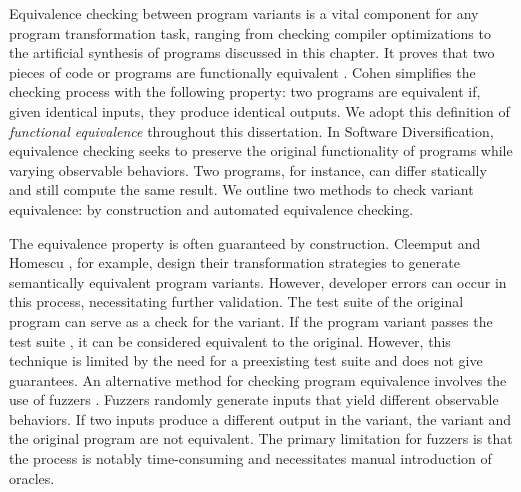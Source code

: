 \label{equivalence:checking}


Equivalence checking between program variants is a vital component for any program transformation task, ranging from checking compiler optimizations \cite{LeCompilers} to the artificial synthesis of programs discussed in this chapter. 
It proves that two pieces of code or programs are functionally equivalent \cite{churchill2019}. 
Cohen \cite{cohen1993operating} simplifies the checking process with the following property: two programs are equivalent if, given identical inputs, they produce identical outputs. 
We adopt this definition of \emph{functional equivalence} throughout this dissertation. 
In Software Diversification, equivalence checking seeks to preserve the original functionality of programs while varying observable behaviors. 
Two programs, for instance, can differ statically and still compute the same result. 
We outline two methods to check variant equivalence: by construction and automated equivalence checking.


\begin{checking}
    \label{check_by_construction}
    The equivalence property is often guaranteed by construction. 
    Cleemput \etal \cite{Cleemput2012} and Homescu \etal \cite{homescu2013profile}, for example, design their transformation strategies to generate semantically equivalent program variants. 
    However, developer errors can occur in this process, necessitating further validation. 
    The test suite of the original program can serve as a check for the variant. 
    If the program variant passes the test suite \cite{harrand2020java}, it can be considered equivalent to the original. 
    However, this technique is limited by the need for a preexisting test suite and does not give guarantees. 
    An alternative method for checking program equivalence involves the use of fuzzers \cite{zalewski2017american}.
    Fuzzers randomly generate inputs that yield different observable behaviors. 
    If two inputs produce a different output in the variant, the variant and the original program are not equivalent. 
    The primary limitation for fuzzers is that the process is notably time-consuming and necessitates manual introduction of oracles.
\end{checking}

